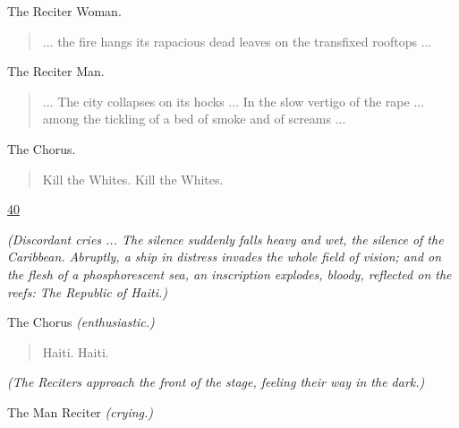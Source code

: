 \documentclass[letterpaper,article,12pt,oneside,notitlepage]{memoir}
\begin{document}
\begin{center}The Reciter Woman.\end{center}

\begin{verse}
\indent ... the fire hangs its rapacious dead leaves on the transfixed rooftops ... \\
\end{verse}

\begin{center}The Reciter Man.\end{center}

\begin{verse}
\indent ... The city collapses on its hocks ... In the slow vertigo of the rape ... among the tickling of a bed of smoke and of screams ... \\
\end{verse}

\begin{center}The Chorus.\end{center}

\begin{verse}
\hspace{1cm} Kill the Whites. Kill the Whites. \\
\end{verse}

\clearpage

\href{http://cesaire.elotroalex.com/chiens/chiens/p040.html}{40}

\textit{(Discordant cries ... The silence suddenly falls heavy and wet, the silence of the Caribbean. Abruptly, a ship in distress invades the whole field of vision; and on the flesh of a phosphorescent sea, an inscription explodes, bloody, reflected on the reefs: The Republic of Haiti.)}

\begin{center}The Chorus \textit{(enthusiastic.)}\end{center}

\begin{verse}
\hspace{1cm} Haiti. Haiti. \\
\end{verse}

\textit{(The Reciters approach the front of the stage, feeling their way in the dark.)}

\begin{center}The Man Reciter \textit{(crying.)}\end{center}
\end{document}
